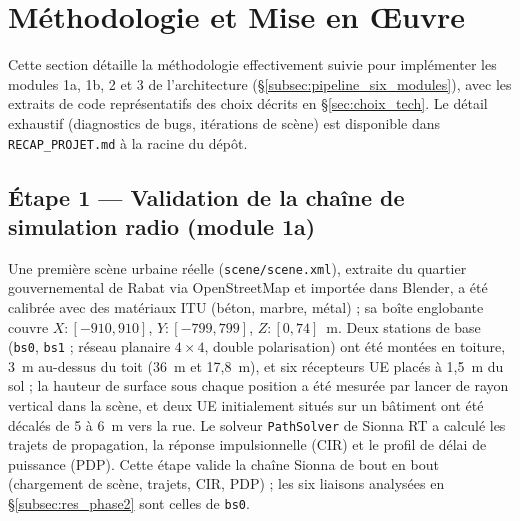 \documentclass[12pt,a4paper,titlepage]{article}
\begin{document}
\section{Méthodologie et Mise en \OE uvre}
\label{sec:methodologie}

Cette section détaille la méthodologie effectivement suivie pour implémenter les modules 1a, 1b, 2 et 3 de l'architecture (\S\ref{subsec:pipeline_six_modules}), avec les extraits de code représentatifs des choix décrits en \S\ref{sec:choix_tech}. Le détail exhaustif (diagnostics de bugs, itérations de scène) est disponible dans \texttt{RECAP\_PROJET.md} à la racine du dépôt.

\subsection{Étape 1 --- Validation de la chaîne de simulation radio (module 1a)}

Une première scène urbaine réelle (\texttt{scene/scene.xml}), extraite du quartier gouvernemental de Rabat via OpenStreetMap et importée dans Blender, a été calibrée avec des matériaux ITU (béton, marbre, métal) ; sa boîte englobante couvre $X\!:\![-910,910]$, $Y\!:\![-799,799]$, $Z\!:\![0,74]$~m. Deux stations de base (\texttt{bs0}, \texttt{bs1} ; réseau planaire $4\times4$, double polarisation) ont été montées en toiture, 3~m au-dessus du toit (36~m et 17,8~m), et six récepteurs UE placés à 1,5~m du sol ; la hauteur de surface sous chaque position a été mesurée par lancer de rayon vertical dans la scène, et deux UE initialement situés sur un bâtiment ont été décalés de 5 à 6~m vers la rue. Le solveur \texttt{PathSolver} de Sionna RT a calculé les trajets de propagation, la réponse impulsionnelle (CIR) et le profil de délai de puissance (PDP). Cette étape valide la chaîne Sionna de bout en bout (chargement de scène, trajets, CIR, PDP) ; les six liaisons analysées en \S\ref{subsec:res_phase2} sont celles de \texttt{bs0}.
\end{document}
